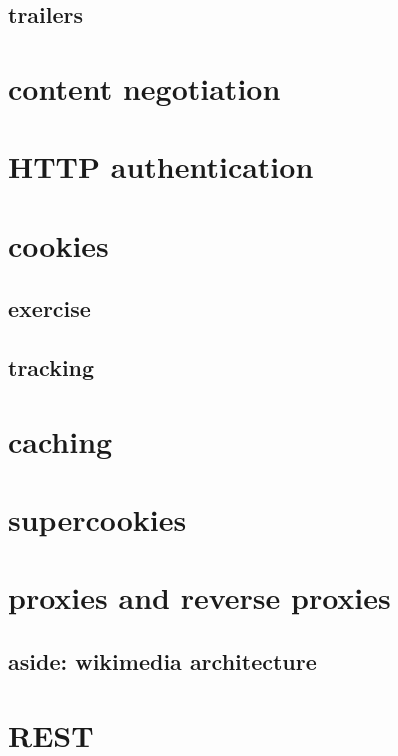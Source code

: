 \subsection{trailers}


\section{content negotiation}


\section{HTTP authentication}

\section{cookies}


\subsection{exercise}


\subsection{tracking}


\section{caching}


\section{supercookies}


\section{proxies and reverse proxies}


\subsection{aside: wikimedia architecture}



\section{REST}


